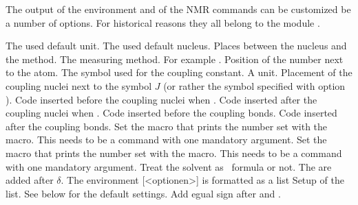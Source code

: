 \documentclass[load-preamble+]{cnltx-doc}
\begin{document}
The output of the environment and of the NMR commands can be customized be a
number of options.  For historical reasons they all belong to the module
.
\begin{options}
    The used default unit.
    The used default nucleus.
  \Default{-}
    Places  between the nucleus and the method.
    The measuring method.
  \Default
    For example .
    Position of the number next to the atom.
    The symbol used for the coupling constant.
    A  unit.
    Placement of the coupling nuclei next to the symbol $J$ (or rather the
    symbol specified with option ).
  \Default{(}
    Code inserted before the coupling nuclei when .
  \Default{)}
    Code inserted after the coupling nuclei when .
  \Default
    Code inserted before the coupling bonds.
  \Default{\cs*{!}}
    Code inserted after the coupling bonds.
    Set the macro that prints the number set with the  macro.  This
    needs to be a command with one mandatory argument.
    Set the macro that prints the number set with the \cs{\#} macro.  This
    needs to be a command with one mandatory argument.
    Treat the solvent as \chemformula\ formula or not.
  \Default
    The  are added after $\delta$.
    The environment [<optionen>]{} is formatted as a list
    Setup of the list. See below for the default settings.
    Add egual sign after  and .
\end{options}
\end{document}

